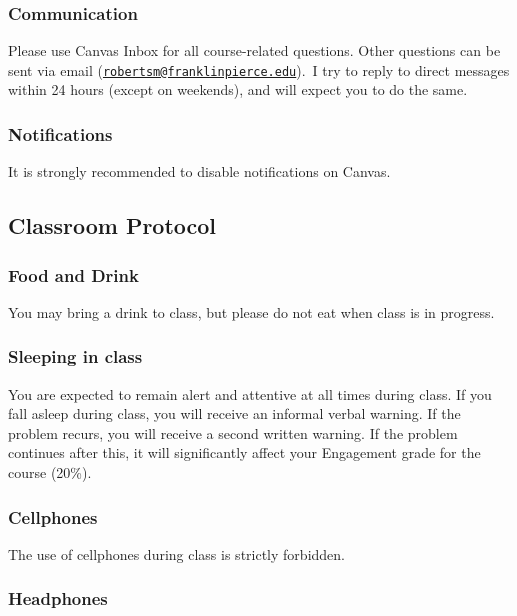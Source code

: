 \documentclass[
  letterpaper,
  DIV=11,
  numbers=noendperiod,
  oneside]{scrartcl}
\begin{document}
\subsubsection{Communication}\label{communication}

Please use Canvas Inbox for all course-related questions. Other
questions can be sent via email
(\href{mailto:robertsm@franklinpierce.edu}{\nolinkurl{robertsm@franklinpierce.edu}}).~I
try to reply to direct messages within 24 hours (except on weekends),
and will expect you to do the same.

\subsubsection{Notifications}\label{notifications}

It is strongly recommended to disable notifications on Canvas.~

\subsection{Classroom Protocol}\label{classroom-protocol}

\subsubsection{Food and Drink}\label{food-and-drink}

You may bring a drink to class, but please do not eat when class is in
progress.

\subsubsection{Sleeping in class}\label{sleeping-in-class}

You are expected to remain alert and attentive at all times during
class. If you fall asleep during class, you will receive an informal
verbal warning. If the problem recurs, you will receive a second written
warning. If the problem continues after this, it will significantly
affect your Engagement grade for the course (20\%).~

\subsubsection{Cellphones}\label{cellphones}

The use of cellphones during class is strictly forbidden.

\subsubsection{Headphones}\label{headphones}
\end{document}
